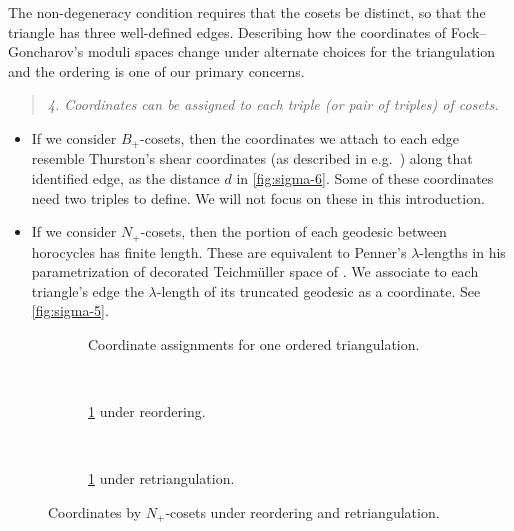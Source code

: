 \documentclass{amsart}
\theoremstyle{plain}
\theoremstyle{definition}
\theoremstyle{remark}
\begin{document}
  The non-degeneracy condition requires that the cosets be distinct, so
  that the triangle has three well-defined edges. Describing how the
  coordinates of Fock--Goncharov's moduli spaces change under alternate
  choices for the triangulation and the ordering is one of our primary
  concerns.

  \begin{quote}
    \emph{4. Coordinates can be assigned to each triple (or pair of
      triples) of cosets.}
  \end{quote}

  \begin{itemize}
  \item
    If we consider $B_{+}$-cosets, then the coordinates we attach to
    each edge resemble Thurston's shear coordinates (as described in
    e.g.\ \cite{bonahon1996}) along that identified edge, as the
    distance $d$ in \cref{fig:sigma-6}. Some of these coordinates need
    two triples to define. We will not focus on these in this
    introduction.
  \item
    If we consider $N_{+}$-cosets, then the portion of each geodesic
    between horocycles has finite length. These are equivalent to
    Penner's $\lambda$-lengths in his parametrization of decorated
    Teichmüller space of \cite{penner1987}. We associate to each
    triangle's edge the $\lambda$-length of its truncated geodesic as a
    coordinate. See \cref{fig:sigma-5}.
  \end{itemize}

  \begin{figure}[h]
    \centering
    \begin{subfigure}[t]{0.25\textwidth}
      \centering 

      \caption{Coordinate assignments for one ordered triangulation.
        \label{fig:sigma-7}
      }
    \end{subfigure}
    ~ \hspace{0.05\textwidth} ~
    \begin{subfigure}[t]{0.25\textwidth}
      \centering 

      \caption{\cref{fig:sigma-7} under reordering.
        \label{fig:sigma-8}
      }
    \end{subfigure}
    ~ \hspace{0.05\textwidth} ~
    \begin{subfigure}[t]{0.25\textwidth}
      \centering 

      \caption{\cref{fig:sigma-7} under retriangulation.
        \label{fig:sigma-9}
      }
    \end{subfigure}
    \caption{Coordinates by $N_{+}$-cosets under reordering and
      retriangulation.
      \label{fig:rotation-and-flip-on-A-coords}
    }
  \end{figure}
\end{document}
